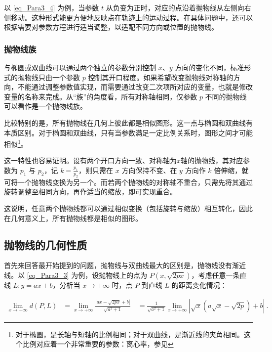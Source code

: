 以 \autoref{eq_Para3_4} 为例，当参数 $t$ 从负变为正时，对应的点沿着抛物线从左侧向右侧移动。这种形式能更方便地反映点在轨迹上的运动过程。在具体问题中，还可以根据需要对参数方程进行适当调整，以适配不同方向或位置的抛物线。

\subsubsection{抛物线族}

与椭圆或双曲线可以通过两个独立的参数分别控制 $x$、$y$ 方向的变化不同，标准形式的抛物线只由一个参数 $p$ 控制其开口程度。如果希望改变抛物线对称轴的方向，不能通过调整参数值实现，而需要通过改变二次项所对应的变量，也就是修改变量的名称来完成。从“族”的角度看，所有对称轴相同，仅参数 $p$ 不同的抛物线可以看作是一个抛物线族。

比较特别的是，所有抛物线在几何上彼此都是相似图形。这一点与椭圆和双曲线有本质区别。对于椭圆和双曲线，只有当参数满足一定比例关系时，图形之间才可能相似\footnote{对于椭圆，是长轴与短轴的比例相同；对于双曲线，是渐近线的夹角相同。这个比例对应着一个非常重要的参数：离心率，参见}。

这一特性也容易证明。设有两个开口方向一致、对称轴为$x$轴的抛物线，其对应参数为 $p_1$ 与 $p_2$，记 $\displaystyle k = \frac{p_1}{p_2}$，则只需在 $x$ 方向保持不变、在 $y$ 方向作 $k$ 倍伸缩，就可将一个抛物线变换为另一个。而若两个抛物线的对称轴不重合，只需先将其通过旋转调整至相同方向，再作适当的缩放，即可实现重合。

这说明，任意两个抛物线都可以通过相似变换（包括旋转与缩放）相互转化，因此在几何意义上，所有抛物线都是相似的图形。

\subsection{抛物线的几何性质}

首先来回答最开始提到的问题，抛物线与双曲线最大的区别是，抛物线没有渐近线。以 \autoref{eq_Para3_3} 为例，设抛物线上的点为 $P(x, \sqrt{2px})$，考虑任意一条直线 $L: y = ax + b$，分析当 $x \to +\infty$ 时，点 $P$ 到直线 $L$ 的距离变化情况：

\begin{equation}
\begin{split}
\lim_{x \to +\infty} d(P, L)
&= \lim_{x \to +\infty} \frac{|ax - \sqrt{2px} + b|}{\sqrt{a^2 + 1}}\
&= \frac{1}{\sqrt{a^2 + 1}} \lim_{x \to +\infty} | \sqrt{x} \left( a\sqrt{x} - \sqrt{2p} \right) + b |~.
\end{split}
\end{equation}

